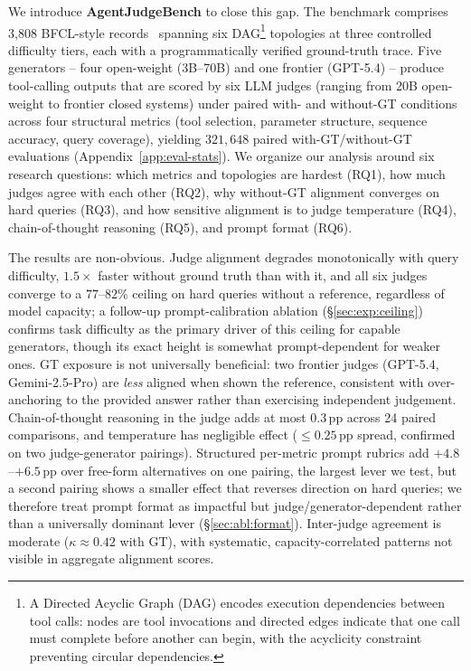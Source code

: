 We introduce \textbf{AgentJudgeBench} to close this gap. The benchmark comprises 3,808 BFCL-style records~\citep{patil2025bfcl} spanning six DAG\footnote{A Directed Acyclic Graph (DAG) encodes execution dependencies between tool calls: nodes are tool invocations and directed edges indicate that one call must complete before another can begin, with the acyclicity constraint preventing circular dependencies.} topologies at three controlled difficulty tiers, each with a programmatically verified ground-truth trace. Five generators -- four open-weight (3B--70B) and one frontier (GPT-5.4) -- produce tool-calling outputs that are scored by six LLM judges (ranging from 20B open-weight to frontier closed systems) under paired with- and without-GT conditions across four structural metrics (tool selection, parameter structure, sequence accuracy, query coverage), yielding $321{,}648$ paired with-GT/without-GT evaluations (Appendix~\ref{app:eval-stats}). We organize our analysis around six research questions: which metrics and topologies are hardest (RQ1), how much judges agree with each other (RQ2), why without-GT alignment converges on hard queries (RQ3), and how sensitive alignment is to judge temperature (RQ4), chain-of-thought reasoning (RQ5), and prompt format (RQ6).

The results are non-obvious. Judge alignment degrades monotonically with query difficulty, $1.5\times$ faster without ground truth than with it, and all six judges converge to a $77$--$82\%$ ceiling on hard queries without a reference, regardless of model capacity; a follow-up prompt-calibration ablation (\S\ref{sec:exp:ceiling}) confirms task difficulty as the primary driver of this ceiling for capable generators, though its exact height is somewhat prompt-dependent for weaker ones. GT exposure is not universally beneficial: two frontier judges (GPT-5.4, Gemini-2.5-Pro) are \emph{less} aligned when shown the reference, consistent with over-anchoring to the provided answer rather than exercising independent judgement. Chain-of-thought reasoning in the judge adds at most $0.3$\,pp across 24 paired comparisons, and temperature has negligible effect (${\leq}0.25$\,pp spread, confirmed on two judge-generator pairings). Structured per-metric prompt rubrics add $+4.8$--$+6.5$\,pp over free-form alternatives on one pairing, the largest lever we test, but a second pairing shows a smaller effect that reverses direction on hard queries; we therefore treat prompt format as impactful but judge/generator-dependent rather than a universally dominant lever (\S\ref{sec:abl:format}). Inter-judge agreement is moderate ($\kappa \approx 0.42$ with GT), with systematic, capacity-correlated patterns not visible in aggregate alignment scores.


